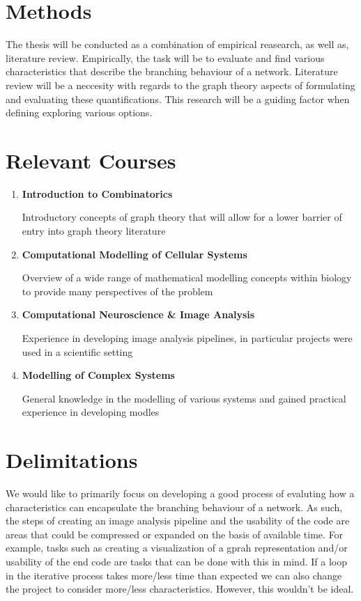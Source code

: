 \documentclass{article}
\begin{document}
\section{Methods}
The thesis will be conducted as a combination of empirical reasearch, as well
as, literature review. Empirically, the task will be to evaluate and
find various characteristics that describe the branching behaviour of
a network. Literature review will be a neccesity with regards
to the graph theory aspects of formulating and evaluating these
quantifications. This research will be a guiding factor when defining exploring
various options.

\section{Relevant Courses}

\begin{enumerate}
    \item \textbf{Introduction to Combinatorics}

    Introductory concepts of graph theory that will allow for a lower barrier
    of entry into graph theory literature

    \item \textbf{Computational Modelling of Cellular Systems}

    Overview of a wide range of mathematical modelling concepts within
    biology to provide many perspectives of the problem

    \item \textbf{Computational Neuroscience \& Image Analysis}

    Experience in developing image analysis pipelines, in particular projects
    were used in a scientific setting

    \item \textbf{Modelling of Complex Systems}

    General knowledge in the modelling of various systems and gained practical
    experience in developing modles

\end{enumerate}

\section{Delimitations}

We would like to primarily focus on developing a good process 
of evaluting how a characteristics can encapsulate the branching behaviour
of a network. As such, the steps of creating an image analysis pipeline and the
usability of the code are areas that could be compressed or expanded on the
basis of available time. For example, tasks such as creating a visualization of a gprah
representation and/or usability of the end code are tasks that can be
done with this in mind. If a loop in the iterative process takes more/less
time than expected we can also change the project to consider more/less
characteristics. However, this wouldn't be ideal.
\end{document}
